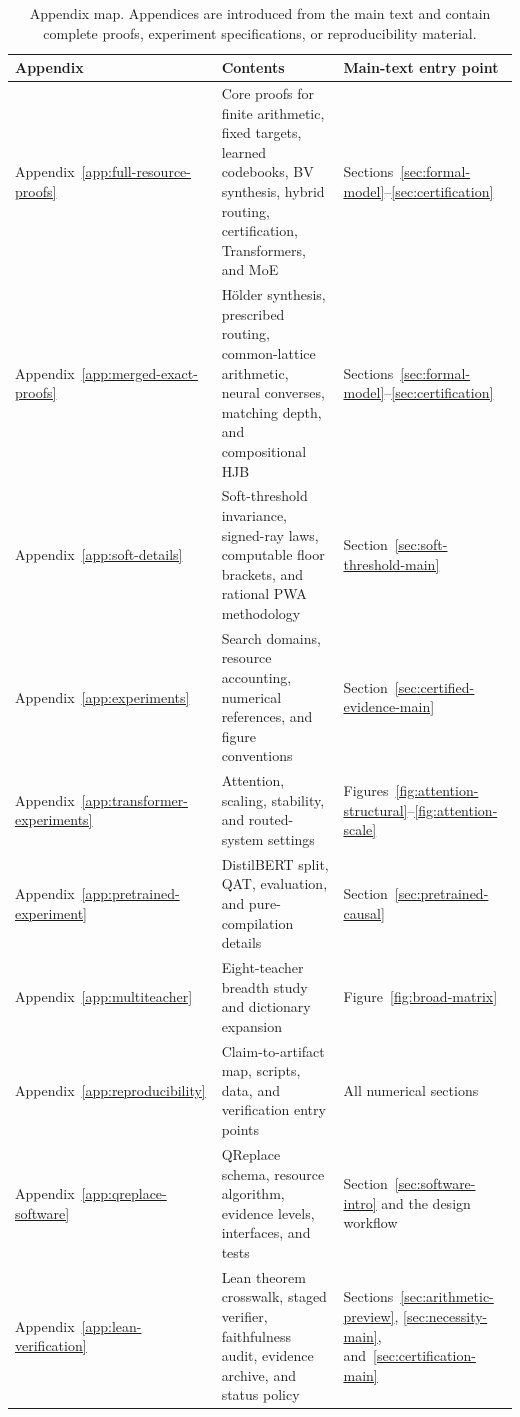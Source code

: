 \documentclass[twoside,11pt]{article}
\begin{document}
\begin{table}[t]
\centering
\caption{Appendix map.  Appendices are introduced from the main text and
contain complete proofs, experiment specifications, or reproducibility
material.}
\label{tab:appendix-map}
\footnotesize
\renewcommand{\arraystretch}{0.96}
\begin{tabularx}{\linewidth}{Y{.18\linewidth}Y{.34\linewidth}X}
\toprule
Appendix & Contents & Main-text entry point\\
\midrule
Appendix~\ref{app:full-resource-proofs} & Core proofs for finite arithmetic, fixed targets, learned codebooks, BV synthesis, hybrid routing, certification, Transformers, and MoE & Sections~\ref{sec:formal-model}--\ref{sec:certification}\\
Appendix~\ref{app:merged-exact-proofs} & H\"older synthesis, prescribed routing, common-lattice arithmetic, neural converses, matching depth, and compositional HJB & Sections~\ref{sec:formal-model}--\ref{sec:certification}\\
Appendix~\ref{app:soft-details} & Soft-threshold invariance, signed-ray laws, computable floor brackets, and rational PWA methodology & Section~\ref{sec:soft-threshold-main}\\
Appendix~\ref{app:experiments} & Search domains, resource accounting, numerical references, and figure conventions & Section~\ref{sec:certified-evidence-main}\\
Appendix~\ref{app:transformer-experiments} & Attention, scaling, stability, and routed-system settings & Figures~\ref{fig:attention-structural}--\ref{fig:attention-scale}\\
Appendix~\ref{app:pretrained-experiment} & DistilBERT split, QAT, evaluation, and pure-compilation details & Section~\ref{sec:pretrained-causal}\\
Appendix~\ref{app:multiteacher} & Eight-teacher breadth study and dictionary expansion & Figure~\ref{fig:broad-matrix}\\
Appendix~\ref{app:reproducibility} & Claim-to-artifact map, scripts, data, and verification entry points & All numerical sections\\
Appendix~\ref{app:qreplace-software} & QReplace schema, resource algorithm, evidence levels, interfaces, and tests & Section~\ref{sec:software-intro} and the design workflow\\
Appendix~\ref{app:lean-verification} & Lean theorem crosswalk, staged verifier, faithfulness audit, evidence archive, and status policy & Sections~\ref{sec:arithmetic-preview}, \ref{sec:necessity-main}, and~\ref{sec:certification-main}\\
\bottomrule
\end{tabularx}
\end{table}
\end{document}
